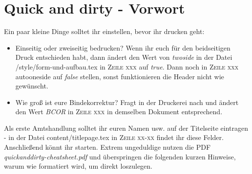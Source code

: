\chapter{Quick and dirty - Vorwort}%
Ein paar kleine Dinge solltet ihr einstellen, bevor ihr drucken geht:%
\begin{itemize}%
\item Einseitig oder zweiseitig bedrucken? Wenn ihr euch für den beidseitigen Druck entschieden habt, dann ändert den Wert von \emph{twoside} in der Datei /style/form-und-aufbau.tex in \textsc{Zeile xxx} auf \emph{true}. Dann noch in \textsc{Zeile xxx} autooneside auf \emph{false} stellen, sonst funktionieren die Header nicht wie gewünscht.
\item Wie groß ist eure Bindekorrektur? Fragt in der Druckerei nach und ändert den Wert \emph{BCOR} in \textsc{Zeile xxx} in demselben Dokument entsprechend.%
\end{itemize}%
Als erste Amtshandlung solltet ihr euren Namen usw. auf der Titelseite eintragen - in der Datei content/titlepage.tex in \textsc{Zeile xx-xx} findet ihr diese Felder. Anschließend könnt ihr starten.%
Extrem ungeduldige nutzen die PDF \emph{quickanddirty-cheatsheet.pdf} und überspringen die folgenden kurzen Hinweise, warum wie formatiert wird, um direkt loszulegen.\\%